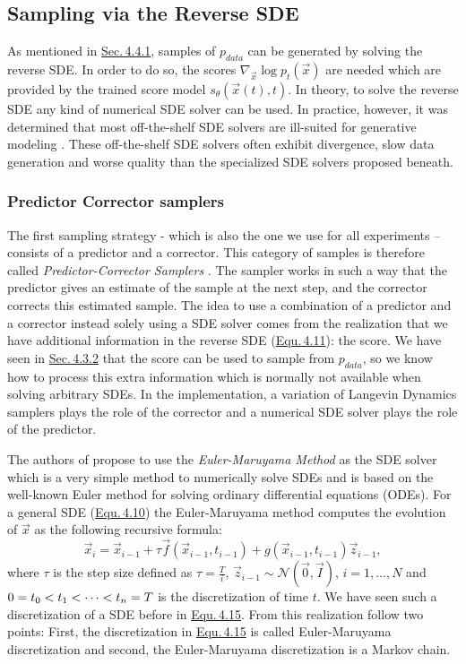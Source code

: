 \subsection{Sampling via the Reverse SDE}
As mentioned in \hyperref[sec:4.4.1]{Sec.\,4.4.1}, samples of $p_{data}$ can be generated by solving the reverse SDE. In order to do so, the scores $\nabla_{\vec{x}}\log p_t(\vec{x})$ are needed which are provided by the trained score model $s_\theta(\vec{x}(t),t)$. In theory, to solve the reverse SDE any kind of numerical SDE solver can be used. In practice, however, it was determined that most off-the-shelf SDE solvers are ill-suited for generative modeling \cite{gotta_go_fast}. These off-the-shelf SDE solvers often exhibit divergence, slow data generation and worse quality than the specialized SDE solvers proposed beneath.

\subsubsection{Predictor Corrector samplers}
The first sampling strategy - which is also the one we use for all experiments – consists of a predictor and a corrector. This category of samples is therefore called \textit{Predictor-Corrector Samplers} \cite{score_3}. The sampler works in such a way that the predictor gives an estimate of the sample at the next step, and the corrector corrects this estimated sample. The idea to use a combination of a predictor and a corrector instead solely using a SDE solver comes from the realization that we have additional information in the reverse SDE (\hyperref[equ:4.11]{Equ.\,4.11}): the score. We have seen in \hyperref[sec:4.3.2]{Sec.\,4.3.2} that the score can be used to sample from $p_{data}$, so we know how to process this extra information which is normally not available when solving arbitrary SDEs. In the implementation, a variation of Langevin Dynamics samplers plays the role of the corrector and a numerical SDE solver plays the role of the predictor.

The authors of \cite{score_3} propose to use the \textit{Euler-Maruyama Method} as the SDE solver which is a very simple method to numerically solve SDEs and is based on the well-known Euler method for solving ordinary differential equations (ODEs). For a general SDE (\hyperref[equ:4.10]{Equ.\,4.10}) the Euler-Maruyama method computes the evolution of $\vec{x}$ as the following recursive formula:
%
\begin{equation} \label{equ:4.20}
    \vec{x}_i=\vec{x}_{i-1}+\tau\vec{f}(\vec{x}_{i-1}, t_{i-1})+g(\vec{x}_{i-1}, t_{i-1})\vec{z}_{i-1},
\end{equation}
%
where $\tau$ is the step size defined as $\tau=\frac{T}{i}$, $\vec{z}_{i-1}\sim\mathcal{N}(\vec{0},\vec{I})$, $i=1,\dots,N$ and\linebreak $0=\nolinebreak t_0< \nolinebreak t_1\nolinebreak< \nolinebreak\dots< \nolinebreak t_n=\nolinebreak T$ is the discretization of time $t$. We have seen such a discretization of a SDE before in \hyperref[equ:4.15]{Equ.\,4.15}. From this realization follow two points: First, the discretization in \hyperref[equ:4.15]{Equ.\,4.15} is called Euler-Maruyama discretization and second, the Euler-Maruyama discretization is a Markov chain.

